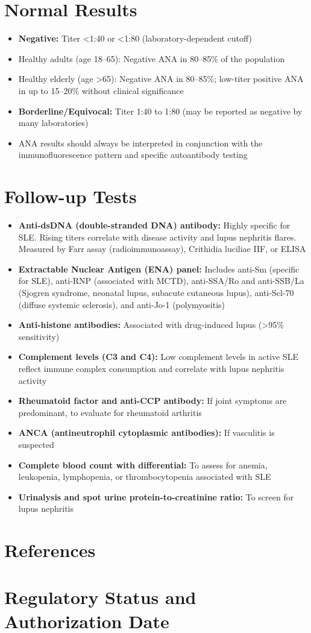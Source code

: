 \section*{Normal Results}
\begin{itemize}
  \item \textbf{Negative:} Titer <1:40 or <1:80 (laboratory-dependent cutoff)
  \item Healthy adults (age 18--65): Negative ANA in 80--85\% of the population
  \item Healthy elderly (age >65): Negative ANA in 80--85\%; low-titer positive ANA in up to 15--20\% without clinical significance
  \item \textbf{Borderline/Equivocal:} Titer 1:40 to 1:80 (may be reported as negative by many laboratories)
  \item ANA results should always be interpreted in conjunction with the immunofluorescence pattern and specific autoantibody testing
\end{itemize}

\section*{Follow-up Tests}
\begin{itemize}
  \item \textbf{Anti-dsDNA (double-stranded DNA) antibody:} Highly specific for SLE. Rising titers correlate with disease activity and lupus nephritis flares. Measured by Farr assay (radioimmunoassay), Crithidia luciliae IIF, or ELISA
  \item \textbf{Extractable Nuclear Antigen (ENA) panel:} Includes anti-Sm (specific for SLE), anti-RNP (associated with MCTD), anti-SSA/Ro and anti-SSB/La (Sjogren syndrome, neonatal lupus, subacute cutaneous lupus), anti-Scl-70 (diffuse systemic sclerosis), and anti-Jo-1 (polymyositis)
  \item \textbf{Anti-histone antibodies:} Associated with drug-induced lupus (>95\% sensitivity)
  \item \textbf{Complement levels (C3 and C4):} Low complement levels in active SLE reflect immune complex consumption and correlate with lupus nephritis activity
  \item \textbf{Rheumatoid factor and anti-CCP antibody:} If joint symptoms are predominant, to evaluate for rheumatoid arthritis
  \item \textbf{ANCA (antineutrophil cytoplasmic antibodies):} If vasculitis is suspected
  \item \textbf{Complete blood count with differential:} To assess for anemia, leukopenia, lymphopenia, or thrombocytopenia associated with SLE
  \item \textbf{Urinalysis and spot urine protein-to-creatinine ratio:} To screen for lupus nephritis
\end{itemize}

\section*{References}



\clearpage
\section*{Regulatory Status and Authorization Date}

\clearpage
